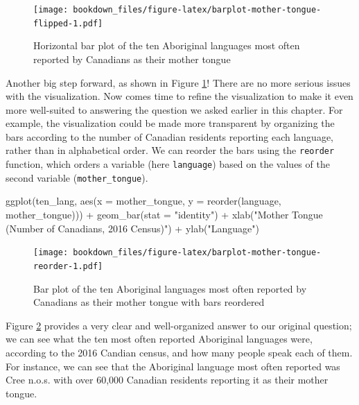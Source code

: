\documentclass[
  12pt,
]{krantz}
\newenvironment{Shaded}{\begin{snugshade}}{\end{snugshade}}
\newcommand{\AttributeTok}[1]{\textcolor[rgb]{0.61,0.61,0.61}{#1}}
\newcommand{\FunctionTok}[1]{\textcolor[rgb]{0,0,0}{#1}}
\newcommand{\NormalTok}[1]{#1}
\newcommand{\SpecialCharTok}[1]{\textcolor[rgb]{0,0,0}{#1}}
\newcommand{\StringTok}[1]{\textcolor[rgb]{0.5,0.5,0.5}{#1}}
\begin{document}
\begin{figure}
\centering
\texttt{[image: bookdown\_files/figure-latex/barplot-mother-tongue-flipped-1.pdf]}
\caption{\label{fig:barplot-mother-tongue-flipped}Horizontal bar plot of the ten Aboriginal languages most often reported by Canadians as their mother tongue}
\end{figure}

Another big step forward, as shown in Figure \ref{fig:barplot-mother-tongue-flipped}! There
are no more serious issues with the visualization. Now comes time to refine
the visualization to make it even more well-suited to answering the question
we asked earlier in this chapter. For example, the visualization could be made more transparent by
organizing the bars according to the number of Canadian residents reporting
each language, rather than in alphabetical order. We can reorder the bars using
the \texttt{reorder}  function, which orders a variable (here \texttt{language}) based on the
values of the second variable (\texttt{mother\_tongue}).

\begin{Shaded}
\begin{Highlighting}[]
\FunctionTok{ggplot}\NormalTok{(ten\_lang, }\FunctionTok{aes}\NormalTok{(}\AttributeTok{x =}\NormalTok{ mother\_tongue, }\AttributeTok{y =} \FunctionTok{reorder}\NormalTok{(language,}
\NormalTok{  mother\_tongue))) }\SpecialCharTok{+} \FunctionTok{geom\_bar}\NormalTok{(}\AttributeTok{stat =} \StringTok{"identity"}\NormalTok{) }\SpecialCharTok{+} \FunctionTok{xlab}\NormalTok{(}\StringTok{"Mother Tongue (Number of Canadians, 2016 Census)"}\NormalTok{) }\SpecialCharTok{+}
  \FunctionTok{ylab}\NormalTok{(}\StringTok{"Language"}\NormalTok{)}
\end{Highlighting}
\end{Shaded}

\begin{figure}
\centering
\texttt{[image: bookdown\_files/figure-latex/barplot-mother-tongue-reorder-1.pdf]}
\caption{\label{fig:barplot-mother-tongue-reorder}Bar plot of the ten Aboriginal languages most often reported by Canadians as their mother tongue with bars reordered}
\end{figure}

Figure \ref{fig:barplot-mother-tongue-reorder} provides a very clear and well-organized
answer to our original question; we can see what the ten most often reported Aboriginal languages
were, according to the 2016 Candian census, and how many people speak each of them. For
instance, we can see that the Aboriginal language most often reported was Cree
n.o.s. with over 60,000 Canadian residents reporting it as their mother tongue.
\end{document}
